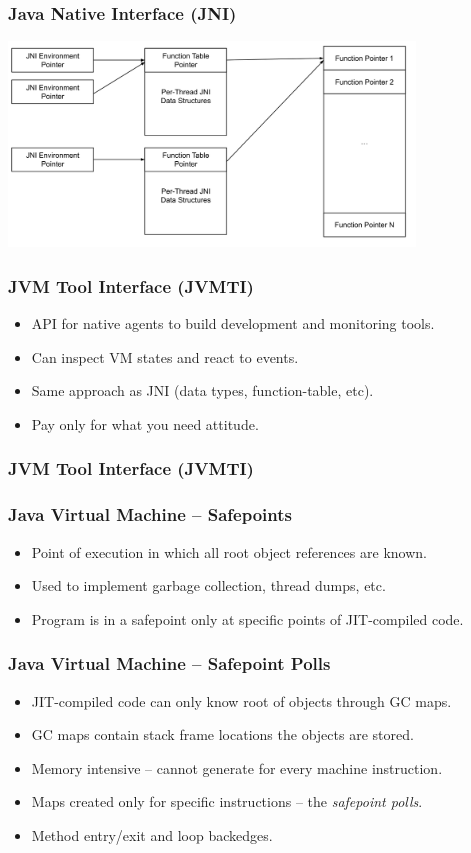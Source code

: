 \documentclass{beamer}
\begin{document}
\begin{frame}
\frametitle{Java Native Interface (JNI)}
\centering
\includegraphics[width=0.81\textwidth]{src/figure/jni_function_table.png}
\end{frame}

\begin{frame}
\frametitle{JVM Tool Interface (JVMTI)}
\begin{itemize}
\item API for native agents to build development and monitoring tools.
\item Can inspect VM states and react to events.
\item Same approach as JNI (data types, function-table, etc).
\item Pay only for what you need attitude.
\end{itemize}
\end{frame}

\begin{frame}
\frametitle{JVM Tool Interface (JVMTI)}

\end{frame}

\begin{frame}
\frametitle{Java Virtual Machine -- Safepoints}
\begin{itemize}
\item Point of execution in which all root object references are known.
\item Used to implement garbage collection, thread dumps, etc.
\item Program is in a safepoint only at specific points of JIT-compiled code.
\end{itemize}
\end{frame}

\begin{frame}
\frametitle{Java Virtual Machine -- Safepoint Polls}
\begin{itemize}
\item JIT-compiled code can only know root of objects through GC maps.
\item GC maps contain stack frame locations the objects are stored.
\item Memory intensive -- cannot generate for every machine instruction.
\item Maps created only for specific instructions -- the \emph{safepoint polls}.
\item Method entry/exit and loop backedges.
\end{itemize}
\end{frame}
\end{document}
